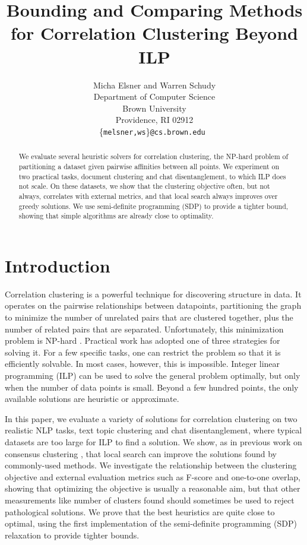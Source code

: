 \documentclass[11pt]{article}
\title{Bounding and Comparing Methods for Correlation Clustering
  Beyond ILP}
\author{Micha Elsner and Warren Schudy\\
Department of Computer Science\\
Brown University \\
Providence, RI 02912 \\
  \{{\tt melsner,ws}\}{\tt @cs.brown.edu }}
\date{}
\begin{document}
\maketitle
\begin{abstract}
We evaluate several heuristic solvers for correlation clustering, the
NP-hard problem of partitioning a dataset given pairwise affinities
between all points. We experiment on two practical tasks, document
clustering and chat disentanglement, to which ILP does not scale. On
these datasets, we show that the clustering objective often, but not
always, correlates with external metrics, and that local search always
improves over greedy solutions. We use semi-definite programming (SDP)
to provide a tighter bound, showing that simple algorithms are already
close to optimality.
\end{abstract}

\section{Introduction}

Correlation clustering is a powerful technique for discovering
structure in data. It operates on the pairwise relationships between
datapoints, partitioning the graph to minimize the number of unrelated
pairs that are clustered together, plus the number of related pairs
that are separated. Unfortunately, this minimization problem is
NP-hard \cite{Ailon08}. Practical work has adopted one of three strategies for
solving it. For a few specific tasks, one can restrict the problem so
that it is efficiently solvable. In most cases, however, this is
impossible. Integer linear programming (ILP) can be used to solve the
general problem optimally, but only when the number of data points is
small. Beyond a few hundred points, the only available solutions are
heuristic or approximate.

In this paper, we evaluate a variety of solutions for correlation
clustering on two realistic NLP tasks, text topic clustering and chat
disentanglement, where typical datasets are too large for ILP to find
a solution. We show, as in previous work on consensus clustering
\cite{Goder08}, that local search can improve the solutions found
by commonly-used methods. We investigate the relationship between
the clustering objective and external evaluation metrics such as
F-score and one-to-one overlap, showing that optimizing the objective
is usually a reasonable aim, but that other measurements like number
of clusters found should sometimes be used to reject pathological
solutions.  We prove that the best heuristics are quite close to
optimal, using the first implementation of the semi-definite
programming (SDP) relaxation to provide tighter bounds.
\end{document}
